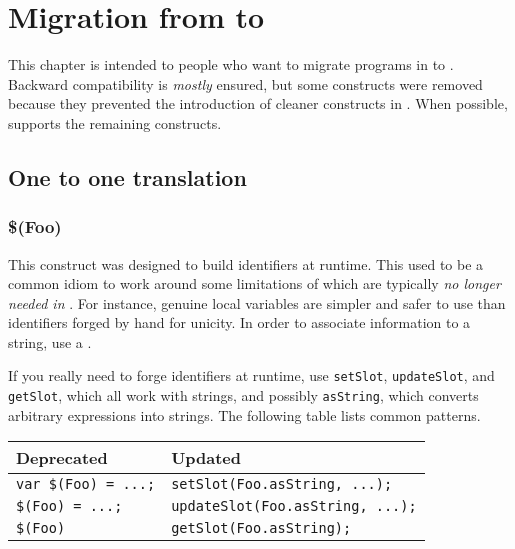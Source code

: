 \chapter{Migration from  to }

This chapter is intended to people who want to migrate programs in  to .  Backward compatibility is \emph{mostly}
ensured, but some  constructs were
removed because they prevented the introduction of cleaner constructs
in .  When possible,  supports the remaining 
constructs.

\section{One to one translation}

\subsection{\$(Foo)}
\label{sec:k122:dollar}

This construct was designed to build identifiers at runtime.  This
used to be a common idiom to work around some limitations of 
which are typically \emph{no longer needed in }.  For instance,
genuine local variables are simpler and safer to use than identifiers
forged by hand for unicity.  In order to associate information to a
string, use a .

If you really need to forge identifiers at runtime, use
\lstinline{setSlot}, \lstinline{updateSlot}, and \lstinline{getSlot},
which all work with strings, and possibly \lstinline{asString}, which
converts arbitrary expressions into strings.  The
following table lists common patterns.

\begin{center}
  \begin{tabular}{|l|l|}
    \hline
    \textbf{Deprecated} & \textbf{Updated}  \\
    \hline
    \lstinline|var $(Foo) = ...;| & \lstinline|setSlot(Foo.asString, ...);|   \\
    \lstinline|$(Foo) = ...;|     & \lstinline|updateSlot(Foo.asString, ...);|\\
    \lstinline|$(Foo)|            & \lstinline|getSlot(Foo.asString);|\\
    \hline
  \end{tabular}%
\end{center}

